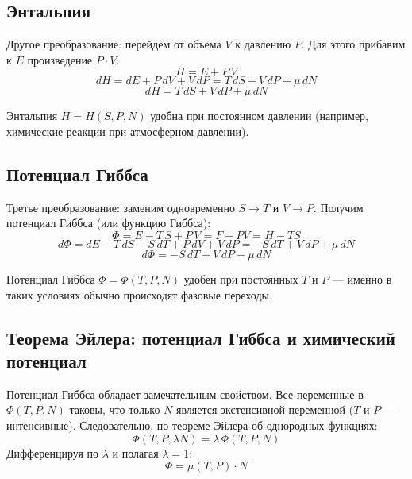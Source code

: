 \documentclass[../general/general]{subfiles}
\begin{document}
\subsection{Энтальпия}

Другое преобразование: перейдём от объёма $V$ к давлению $P$. Для этого прибавим к $E$ произведение $P\cdot V$:
\begin{equation}
    H = E + P\,V
\end{equation}
\begin{equation}
    dH = dE + P\,dV + V\,dP = T\,dS + V\,dP + \mu\,dN
\end{equation}
\begin{equation}
    \boxed{dH = T\,dS + V\,dP + \mu\,dN}
    \label{eq:dH}
\end{equation}

Энтальпия $H = H(S, P, N)$ удобна при постоянном давлении (например, химические реакции при атмосферном давлении).

\subsection{Потенциал Гиббса}

Третье преобразование: заменим одновременно $S \to T$ и $V \to P$. Получим потенциал Гиббса (или функцию Гиббса):
\begin{equation}
    \Phi = E - T\,S + P\,V = F + PV = H - TS
\end{equation}
\begin{equation}
    d\Phi = dE - T\,dS - S\,dT + P\,dV + V\,dP = -S\,dT + V\,dP + \mu\,dN
\end{equation}
\begin{equation}
    \boxed{d\Phi = -S\,dT + V\,dP + \mu\,dN}
    \label{eq:dPhi}
\end{equation}

Потенциал Гиббса $\Phi = \Phi(T, P, N)$ удобен при постоянных $T$ и $P$ --- именно в таких условиях обычно происходят фазовые переходы.

\subsection{Теорема Эйлера: потенциал Гиббса и химический потенциал}

Потенциал Гиббса обладает замечательным свойством. Все переменные в $\Phi(T, P, N)$ таковы, что только $N$ является экстенсивной переменной ($T$ и $P$ --- интенсивные). Следовательно, по теореме Эйлера об однородных функциях:
\begin{equation}
    \Phi(T, P, \lambda N) = \lambda\,\Phi(T, P, N)
\end{equation}
Дифференцируя по $\lambda$ и полагая $\lambda = 1$:
\begin{equation}
    \boxed{\Phi = \mu(T, P)\cdot N}
    \label{eq:Phi_muN}
\end{equation}
\end{document}
